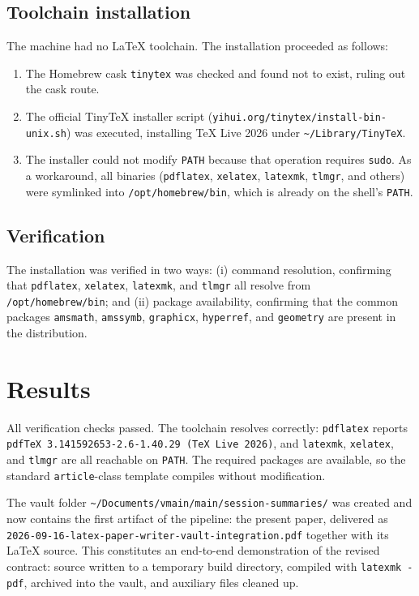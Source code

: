 \documentclass[11pt]{article}
\begin{document}
\subsection{Toolchain installation}
\label{sec:install}

The machine had no \LaTeX{} toolchain. The installation proceeded as follows:

\begin{enumerate}
  \item The Homebrew cask \texttt{tinytex} was checked and found not to exist, ruling out the cask route.
  \item The official TinyTeX installer script (\texttt{yihui.org/tinytex/install-bin-unix.sh}) was executed, installing TeX Live 2026 under \texttt{\textasciitilde/Library/TinyTeX}.
  \item The installer could not modify \texttt{PATH} because that operation requires \texttt{sudo}. As a workaround, all binaries (\texttt{pdflatex}, \texttt{xelatex}, \texttt{latexmk}, \texttt{tlmgr}, and others) were symlinked into \texttt{/opt/homebrew/bin}, which is already on the shell's \texttt{PATH}.
\end{enumerate}

\subsection{Verification}
\label{sec:verify}

The installation was verified in two ways: (i) command resolution, confirming that \texttt{pdflatex}, \texttt{xelatex}, \texttt{latexmk}, and \texttt{tlmgr} all resolve from \texttt{/opt/homebrew/bin}; and (ii) package availability, confirming that the common packages \texttt{amsmath}, \texttt{amssymb}, \texttt{graphicx}, \texttt{hyperref}, and \texttt{geometry} are present in the distribution.

\section{Results}
\label{sec:results}

All verification checks passed. The toolchain resolves correctly: \texttt{pdflatex} reports \texttt{pdfTeX 3.141592653-2.6-1.40.29 (TeX Live 2026)}, and \texttt{latexmk}, \texttt{xelatex}, and \texttt{tlmgr} are all reachable on \texttt{PATH}. The required packages are available, so the standard \texttt{article}-class template compiles without modification.

The vault folder \texttt{\textasciitilde/Documents/vmain/main/session-summaries/} was created and now contains the first artifact of the pipeline: the present paper, delivered as \texttt{2026-09-16-latex-paper-writer-vault-integration.pdf} together with its \LaTeX{} source. This constitutes an end-to-end demonstration of the revised contract: source written to a temporary build directory, compiled with \texttt{latexmk -pdf}, archived into the vault, and auxiliary files cleaned up.
\end{document}
